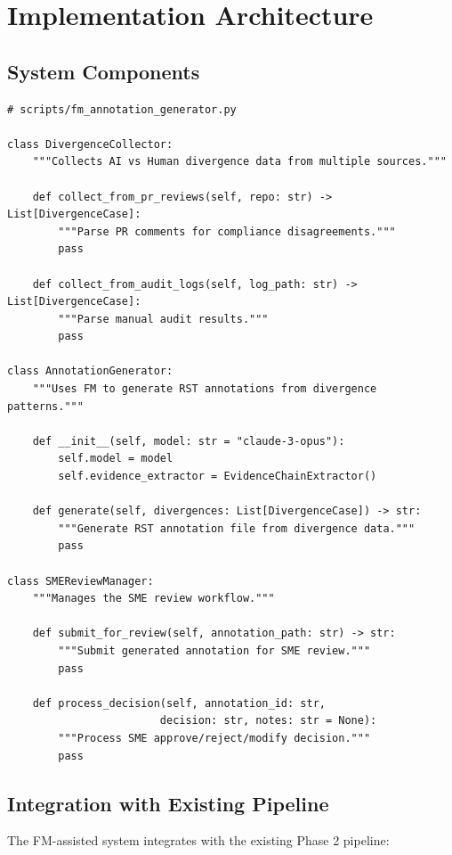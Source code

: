 \documentclass[11pt,a4paper]{article}
\begin{document}
\section{Implementation Architecture}

\subsection{System Components}

\begin{lstlisting}[style=python, caption={Core Implementation Classes}]
# scripts/fm_annotation_generator.py

class DivergenceCollector:
    """Collects AI vs Human divergence data from multiple sources."""
    
    def collect_from_pr_reviews(self, repo: str) -> List[DivergenceCase]:
        """Parse PR comments for compliance disagreements."""
        pass
    
    def collect_from_audit_logs(self, log_path: str) -> List[DivergenceCase]:
        """Parse manual audit results."""
        pass

class AnnotationGenerator:
    """Uses FM to generate RST annotations from divergence patterns."""
    
    def __init__(self, model: str = "claude-3-opus"):
        self.model = model
        self.evidence_extractor = EvidenceChainExtractor()
    
    def generate(self, divergences: List[DivergenceCase]) -> str:
        """Generate RST annotation file from divergence data."""
        pass

class SMEReviewManager:
    """Manages the SME review workflow."""
    
    def submit_for_review(self, annotation_path: str) -> str:
        """Submit generated annotation for SME review."""
        pass
    
    def process_decision(self, annotation_id: str, 
                        decision: str, notes: str = None):
        """Process SME approve/reject/modify decision."""
        pass
\end{lstlisting}

\subsection{Integration with Existing Pipeline}

The FM-assisted system integrates with the existing Phase 2 pipeline:
\end{document}
